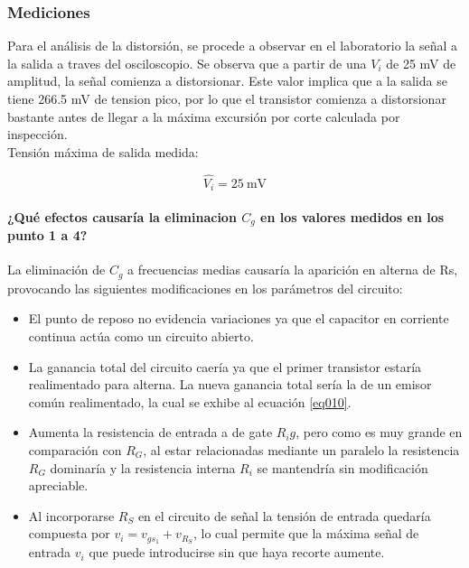 \documentclass[a4paper,10pt]{article}
\begin{document}
				 
			\subsubsection{Mediciones}
			Para el análisis de la distorsión, se procede a observar en el laboratorio la señal a la salida a traves del osciloscopio. Se observa que a partir de 
			una $V_i$ de 25 mV de amplitud, la señal comienza a distorsionar. Este valor implica que a la salida se tiene 266.5 mV de tension pico, por lo que 
			el transistor comienza a distorsionar bastante antes de llegar a la máxima excursión por corte calculada por inspección. \\
 			\indent Tensi\'{o}n m\'{a}xima de salida medida:	

			\begin{displaymath}
				\hat{V_i} = 25~\text{mV}
			\end{displaymath}			

			\paragraph{¿Qué efectos causaría la eliminacion $C_g$ en los valores medidos en los punto 1 a 4?}
			La eliminación de $C_g$ a frecuencias medias causaría la aparición en alterna de Rs, provocando las siguientes modificaciones en los parámetros del circuito:
			\begin{itemize}
				\item El punto de reposo no evidencia variaciones ya que el capacitor en corriente continua actúa como un circuito abierto.
				\item La ganancia total del circuito caería ya que el primer transistor estaría realimentado para alterna. La nueva ganancia total sería la de un 
				emisor común realimentado, la cual se exhibe al ecuación \ref{eq010}.
				\item Aumenta la resistencia de entrada a de gate $R_ig$, pero como es muy grande en comparación con $R_G$, al estar relacionadas mediante un paralelo la
				resistencia $R_G$ dominaría y la resistencia interna $R_i$ se mantendría sin modificación apreciable.
				\item Al incorporarse $R_S$ en el circuito de señal la tensión de entrada quedaría compuesta por $v_i = v_{gs_1} + v_{R_S}$, lo cual permite que la 
				máxima señal de entrada $v_i$ que puede introducirse sin que haya recorte aumente.
			\end{itemize}
				
\end{document}
